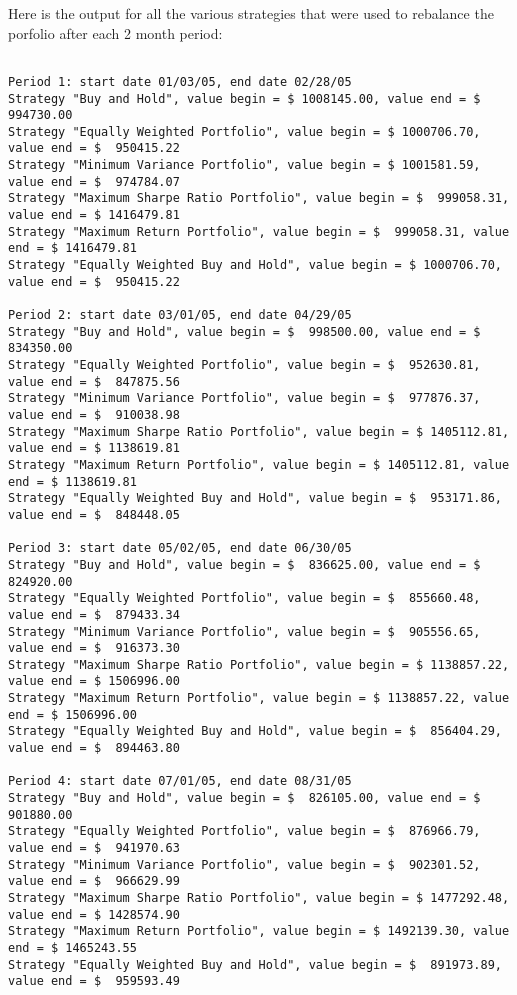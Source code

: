 \documentclass[english]{scrartcl}
\begin{document}
	Here is the output for all the various strategies that were used to rebalance the porfolio after each 2 month period:
	\begin{verbatim}
	
Period 1: start date 01/03/05, end date 02/28/05
Strategy "Buy and Hold", value begin = $ 1008145.00, value end = $  994730.00
Strategy "Equally Weighted Portfolio", value begin = $ 1000706.70, value end = $  950415.22
Strategy "Minimum Variance Portfolio", value begin = $ 1001581.59, value end = $  974784.07
Strategy "Maximum Sharpe Ratio Portfolio", value begin = $  999058.31, value end = $ 1416479.81
Strategy "Maximum Return Portfolio", value begin = $  999058.31, value end = $ 1416479.81
Strategy "Equally Weighted Buy and Hold", value begin = $ 1000706.70, value end = $  950415.22

Period 2: start date 03/01/05, end date 04/29/05
Strategy "Buy and Hold", value begin = $  998500.00, value end = $  834350.00
Strategy "Equally Weighted Portfolio", value begin = $  952630.81, value end = $  847875.56
Strategy "Minimum Variance Portfolio", value begin = $  977876.37, value end = $  910038.98
Strategy "Maximum Sharpe Ratio Portfolio", value begin = $ 1405112.81, value end = $ 1138619.81
Strategy "Maximum Return Portfolio", value begin = $ 1405112.81, value end = $ 1138619.81
Strategy "Equally Weighted Buy and Hold", value begin = $  953171.86, value end = $  848448.05

Period 3: start date 05/02/05, end date 06/30/05
Strategy "Buy and Hold", value begin = $  836625.00, value end = $  824920.00
Strategy "Equally Weighted Portfolio", value begin = $  855660.48, value end = $  879433.34
Strategy "Minimum Variance Portfolio", value begin = $  905556.65, value end = $  916373.30
Strategy "Maximum Sharpe Ratio Portfolio", value begin = $ 1138857.22, value end = $ 1506996.00
Strategy "Maximum Return Portfolio", value begin = $ 1138857.22, value end = $ 1506996.00
Strategy "Equally Weighted Buy and Hold", value begin = $  856404.29, value end = $  894463.80

Period 4: start date 07/01/05, end date 08/31/05
Strategy "Buy and Hold", value begin = $  826105.00, value end = $  901880.00
Strategy "Equally Weighted Portfolio", value begin = $  876966.79, value end = $  941970.63
Strategy "Minimum Variance Portfolio", value begin = $  902301.52, value end = $  966629.99
Strategy "Maximum Sharpe Ratio Portfolio", value begin = $ 1477292.48, value end = $ 1428574.90
Strategy "Maximum Return Portfolio", value begin = $ 1492139.30, value end = $ 1465243.55
Strategy "Equally Weighted Buy and Hold", value begin = $  891973.89, value end = $  959593.49


\end{verbatim}
\end{document}
